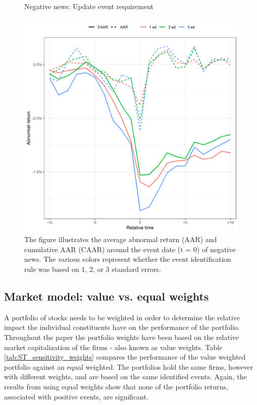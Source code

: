 \begin{figure} [h]
    \centering
    \caption{Negative news: Update event requirement}
    \includegraphics[scale=0.6]{Projekt/1.Figures analysis/ST_negative_sensitivity.png}
     \caption*{\footnotesize The figure illustrates the average abnormal return (AAR) and cumulative AAR (CAAR) around the event date (t = 0) of negative news. The various colors represent whether the event identification rule was based on 1, 2, or 3 standard errors.  }
    \label{fig:ST_neg_sensitivity}
\end{figure} 


\subsection{Market model: value vs. equal weights}

A portfolio of stocks needs to be weighted in order to determine the relative impact the individual constituents have on the performance of the portfolio. Throughout the paper the portfolio weights have been based on the relative market capitalization of the firms - also known as value weights. Table \ref{tab:ST_sensitivity_weights} compares the performance of the value weighted portfolio against an equal weighted. The portfolios hold the same firms, however with different weights, and are based on the same identified events. Again, the results from using equal weights show that none of the portfolio returns, associated with positive events, are significant. 


